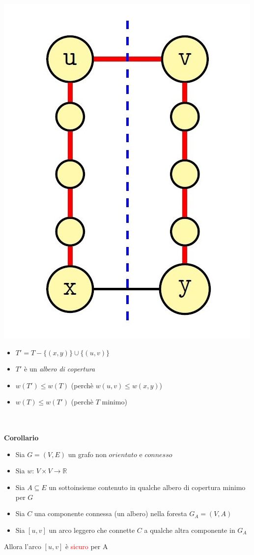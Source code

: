 \documentclass[../cheatSheetAlgoritmi.tex]{subfiles}
\begin{document}
\noindent\begin{minipage}{0.3\textwidth}
\includegraphics[width=\linewidth]{../img/Greedy_6.jpg}
\end{minipage}
\hfill
\begin{minipage}{0.6\textwidth}\raggedleft
\begin{itemize}
	\item $T' = T - \{(x, y)\} \cup \{(u, v)\}$
	\item $T'$ è un \emph{albero di copertura}
	\item $w(T') \leq w(T)$ (perchè $w(u, v) \leq w(x, y)$)
	\item $w(T) \leq w(T')$ (perchè $T$ minimo)
\end{itemize}
\end{minipage} \\\\
\textbf{Corollario}
\begin{itemize}
	\item Sia $G = (V, E)$ un grafo non $orientato$ e $connesso$
	\item Sia $w$: $V \times V \rightarrow \mathbb{R}$
	\item Sia $A \subseteq E$ un sottoinsieme contenuto in qualche albero di copertura minimo per $G$
	\item Sia $C$ una componente connessa (un albero) nella foresta $G_{A} = (V, A)$
	\item Sia $[u, v]$ un arco leggero che connette $C$ a qualche altra componente in $G_{A}$
\end{itemize}
Allora l'arco $[u, v]$ è \textcolor{red}{sicuro} per A
\newpage
\end{document}
